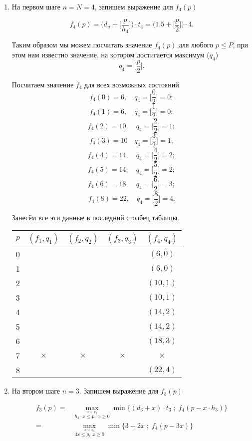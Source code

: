 \begin{enumerate}
	\item[\fbox{\textbf{Шаг 1}}] На первом шаге $n = N = 4$, запишем выражение для $f_4(p)$
	
	\[
	f_4(p) = \bigg(d_n + \bigg[\frac{p}{h_4}\bigg]\bigg) \cdot t_4 = \bigg(1.5 + \bigg[\frac{p}{2}\bigg]\bigg) \cdot 4.
	\]
	
	Таким образом мы можем посчитать значение $f_4(p)$ для любого $p \le P$, при этом нам известно значение, на котором достигается максимум ($q_4$)
	\[
	q_4 = \bigg[\frac{p}{2}\bigg].
	\]
	
	
	Посчитаем значение $f_4$ для всех возможных состояний
	\[
	f_4(0) = 6, \quad q_4 = \bigg[\frac{0}{2}\bigg] = 0;
	\]
	\[
	f_4(1) = 6, \quad q_4 = \bigg[\frac{1}{2}\bigg] = 0;
	\]
	\[
	f_4(2) = 10, \quad q_4 = \bigg[\frac{2}{2}\bigg] = 1;
	\]
	\[
	f_4(3) = 10 \quad q_4 = \bigg[\frac{3}{2}\bigg] = 1;
	\]
	\[
	f_4(4) = 14, \quad q_4 = \bigg[\frac{4}{2}\bigg] = 2;
	\]
	\[
	f_4(5) = 14, \quad q_4 = \bigg[\frac{5}{2}\bigg] = 2;
	\]
	\[
	f_4(6) = 18, \quad q_4 = \bigg[\frac{6}{2}\bigg] = 3;
	\]
	\[
	f_4(8) = 22, \quad q_4 = \bigg[\frac{8}{2}\bigg] = 4.
	\]
	
	Занесём все эти данные в последний столбец таблицы.
	
	\begin{table}[H]
		\centering
		\begin{tabular}{ | c | c | c | c | c | } 
			\hline
			$p$ & $(f_1, q_1)$ & $(f_2, q_2)$ & $(f_3, q_3)$ & $(f_4, q_4)$ \\ 
			\hline
			0 & & & & $(6, 0)$ \\\hline
			1 & & & & $(6, 0)$ \\\hline
			2 & & & & $(10, 1)$ \\\hline
			3 & & & & $(10, 1)$ \\\hline
			4 & & & & $(14, 2)$ \\\hline
			5 & & & & $(14, 2)$ \\\hline
			6 & & & & $(18, 3)$ \\\hline
			7 & $\times$ & $\times$   & $\times$ & $\times$ \\\hline
			8 & & & & $(22, 4)$ \\\hline
		\end{tabular}
	\end{table}
	
	\item[\fbox{\textbf{Шаг 2}}] На втором шаге $n = 3$. Запишем выражение для $f_3(p)$
	
	\begin{align*}
		f_3(p) =& \max_{\stackrel{x = x_3}{h_3 \cdot x \le p, \; x \ge 0}} \min\Big\{(d_3 + x) \cdot t_3 \; ; \; f_{4}(p - x \cdot h_3)\Big\} \\
		=& \max_{\stackrel{x = x_3}{3x \le p, \; x \ge 0}} \min\Big\{3 + 2x \; ; \; f_{4}(p - 3x)\Big\}
	\end{align*}
	

\end{enumerate}
